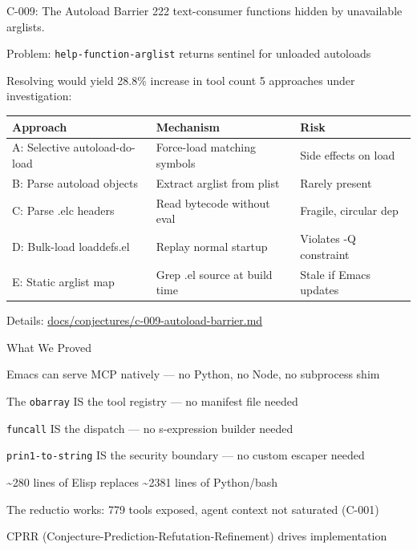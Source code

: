 \documentclass[presentation]{beamer}
\begin{document}
\begin{frame}[label={sec:org60ae4ce},fragile]{C-009: The Autoload Barrier}
 222 text-consumer functions hidden by unavailable arglists.
\begin{block}{Problem: \texttt{help-function-arglist} returns sentinel for unloaded autoloads}
\end{block}
\begin{block}{Resolving would yield 28.8\% increase in tool count}
5 approaches under investigation:

\begin{center}
\begin{tabular}{lll}
Approach & Mechanism & Risk\\
\hline
A: Selective autoload-do-load & Force-load matching symbols & Side effects on load\\
B: Parse autoload objects & Extract arglist from plist & Rarely present\\
C: Parse .elc headers & Read bytecode without eval & Fragile, circular dep\\
D: Bulk-load loaddefs.el & Replay normal startup & Violates -Q constraint\\
E: Static arglist map & Grep .el source at build time & Stale if Emacs updates\\
\end{tabular}
\end{center}

Details: \href{../../conjectures/c-009-autoload-barrier.md}{docs/conjectures/c-009-autoload-barrier.md}
\end{block}
\end{frame}
\begin{frame}[label={sec:org11fc12c},fragile]{What We Proved}
 \begin{block}{Emacs can serve MCP natively --- no Python, no Node, no subprocess shim}
\end{block}
\begin{block}{The \texttt{obarray} IS the tool registry --- no manifest file needed}
\end{block}
\begin{block}{\texttt{funcall} IS the dispatch --- no s-expression builder needed}
\end{block}
\begin{block}{\texttt{prin1-to-string} IS the security boundary --- no custom escaper needed}
\end{block}
\begin{block}{\textasciitilde{}280 lines of Elisp replaces \textasciitilde{}2381 lines of Python/bash}
\end{block}
\begin{block}{The reductio works: 779 tools exposed, agent context not saturated (C-001)}
\end{block}
\begin{block}{CPRR (Conjecture-Prediction-Refutation-Refinement) drives implementation}
\end{block}
\end{frame}
\end{document}
